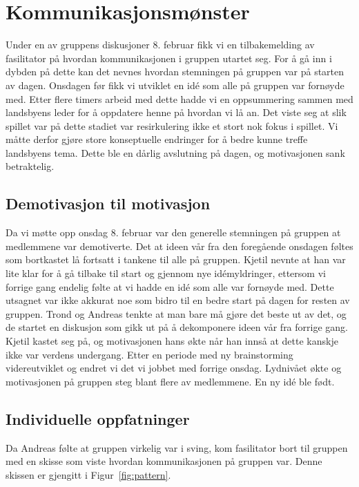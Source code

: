 
\section{Kommunikasjonsmønster} %
Under en av gruppens diskusjoner 8. februar fikk vi en tilbakemelding av
fasilitator på hvordan kommunikasjonen i gruppen utartet seg. For å gå
inn i dybden på dette kan det nevnes hvordan stemningen på gruppen var
på starten av dagen. Onsdagen før fikk vi utviklet en idé som alle på
gruppen var fornøyde med. Etter flere timers arbeid med dette hadde vi
en oppsummering sammen med landsbyens leder for å oppdatere henne på
hvordan vi lå an. Det viste seg at slik spillet var på dette stadiet var
resirkulering ikke et stort nok fokus i spillet. Vi måtte derfor gjøre
store konseptuelle endringer for å bedre kunne treffe landsbyens tema.
Dette ble en dårlig avslutning på dagen, og motivasjonen sank
betraktelig.

\subsection{Demotivasjon til motivasjon}
Da vi møtte opp onsdag 8. februar var den generelle stemningen på
gruppen at medlemmene var demotiverte. Det at ideen vår fra den
foregående onsdagen føltes som bortkastet lå fortsatt i tankene til alle
på gruppen. Kjetil nevnte at han var lite klar for å gå tilbake til
start og gjennom nye idémyldringer, ettersom vi forrige gang endelig
følte at vi hadde en idé som alle var fornøyde med. Dette utsagnet var
ikke akkurat noe som bidro til en bedre start på dagen for resten av
gruppen. Trond og Andreas tenkte at man bare må gjøre det beste ut av
det, og de startet en diskusjon som gikk ut på å dekomponere ideen vår
fra forrige gang. Kjetil kastet seg på, og motivasjonen hans økte når
han innså at dette kanskje ikke var verdens undergang. Etter en periode
med ny brainstorming videreutviklet og endret vi det vi jobbet med
forrige onsdag. Lydnivået økte og motivasjonen på gruppen steg blant
flere av medlemmene. En ny idé ble født.

\subsection{Individuelle oppfatninger}
Da Andreas følte at gruppen virkelig var i sving, kom fasilitator bort
til gruppen med en skisse som viste hvordan kommunikasjonen på gruppen
var. Denne skissen er gjengitt i Figur~\ref{fig:pattern}.

